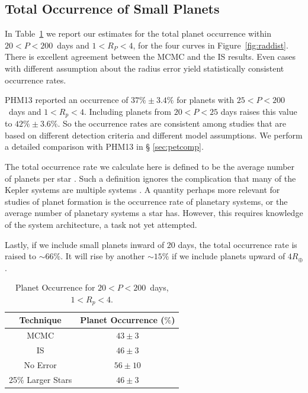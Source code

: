 \subsection{Total Occurrence of Small Planets}
\label{sec:totaloccur}
In Table~\ref{tab:occ} we report our estimates for the total planet
occurrence within $20 < P < 200$~days and $1 < R_P < 4$\rearth{}, for
the four curves in Figure~\ref{fig:raddist}. There is excellent
agreement between the MCMC and the IS results. Even cases with
different assumption about the radius error yield statistically
consistent occurrence rates.

PHM13 reported an occurrence of $37\% \pm 3.4\%$ for planets with 
$25<P<200$~days and $1<R_p<4$\rearth{}. Including planets from 
$20 < P < 25$ days raises this value to $42\% \pm 3.6\%$.  
So the occurrence rates are consistent among
studies that are based on different detection criteria and different
model assumptions.  We perform a detailed comparison with PHM13 in \S
\ref{sec:petcomp}.

The total occurrence rate we calculate here is defined to be the
average number of planets per star
\citep{Youdin,Fressin2013,Petigura2013}. Such a definition ignores
the complication that many of the Kepler systems are multiple
systems \citep[e.g.][]{Lissauer}. A quantity perhaps more
relevant for studies of planet formation is the occurrence
rate of planetary systems, or the average number of planetary
systems a star has. However, this requires knowledge of the system
architecture, a task not yet attempted.  

Lastly, if we include small planets inward of $20$ days, the total
occurrence rate is raised to $\sim 66\%$. It will rise by another
$\sim 15\%$ if we include planets upward of $4 R_\oplus$.

\begin{table}[h]
\centering
\caption{Planet Occurrence for $20<P<200$~days, $1<R_p<4$\rearth{}.}
\begin{tabular}{c|c}\hline Technique & Planet Occurrence ($\%$)\\\hline
MCMC                   & $43 \pm 3$ \\
IS                     & $46 \pm 3$ \\
No Error               & $56 \pm 10$ \\
25$\%$ Larger Stars    & $46 \pm 3$ \\
\hline
\end{tabular}
\label{tab:occ}
\end{table}

